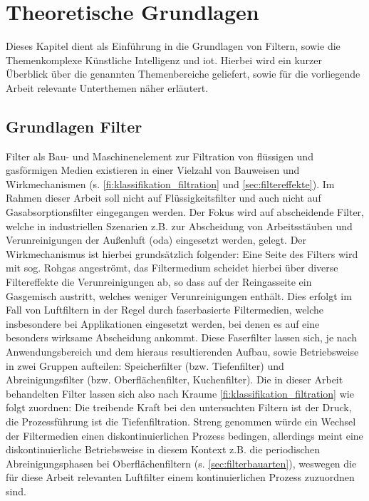 \chapter{Theoretische Grundlagen}
\label{ch:Theoretische Grundlagen}
Dieses Kapitel dient als Einführung in die Grundlagen von Filtern, sowie die Themenkomplexe Künstliche Intelligenz und \ac*{iot}. Hierbei wird ein kurzer Überblick über die genannten Themenbereiche geliefert, sowie für die vorliegende Arbeit relevante Unterthemen näher erläutert.
\section{Grundlagen Filter}
Filter als Bau- und Maschinenelement zur Filtration von flüssigen und gasförmigen Medien existieren in einer Vielzahl von Bauweisen und Wirkmechanismen 
(s. \ref{fi:klassifikation_filtration} und \ref{sec:filtereffekte}). Im Rahmen dieser Arbeit soll nicht auf Flüssigkeitsfilter und auch nicht auf Gasabsorptionsfilter eingegangen werden. Der Fokus wird auf abscheidende Filter, welche in industriellen Szenarien z.B. zur Abscheidung von Arbeitsstäuben und Verunreinigungen der Außenluft (\ac{oda}) eingesetzt werden, gelegt. \newline Der Wirkmechanismus ist hierbei grundsätzlich folgender: Eine Seite des Filters wird mit sog. Rohgas angeströmt, das Filtermedium scheidet hierbei über diverse Filtereffekte die Verunreinigungen ab, so dass auf der Reingasseite ein Gasgemisch austritt, welches weniger Verunreinigungen enthält. Dies erfolgt im Fall von Luftfiltern in der Regel durch faserbasierte Filtermedien, welche insbesondere bei Applikationen eingesetzt werden, bei denen es auf eine besonders wirksame Abscheidung ankommt.\cite{Staubabscheidung} Diese Faserfilter lassen sich, je nach Anwendungsbereich und dem hieraus resultierenden Aufbau, sowie Betriebsweise in zwei Gruppen aufteilen: Speicherfilter (bzw. Tiefenfilter) und Abreinigungsfilter (bzw. Oberflächenfilter, Kuchenfilter). \cite{AbscheidungPartikel} \newline
Die in dieser Arbeit behandelten Filter lassen sich also nach Kraume \ref{fi:klassifikation_filtration} wie folgt zuordnen: Die treibende Kraft bei den untersuchten Filtern ist der Druck, die Prozessführung ist die Tiefenfiltration. Streng genommen würde ein Wechsel der Filtermedien einen diskontinuierlichen Prozess bedingen, allerdings meint eine diskontinuierliche Betriebsweise in diesem Kontext z.B. die periodischen Abreinigungsphasen bei Oberflächenfiltern (s. \ref{sec:filterbauarten}), weswegen die für diese Arbeit relevanten Luftfilter einem kontinuierlichen Prozess zuzuordnen sind. 
